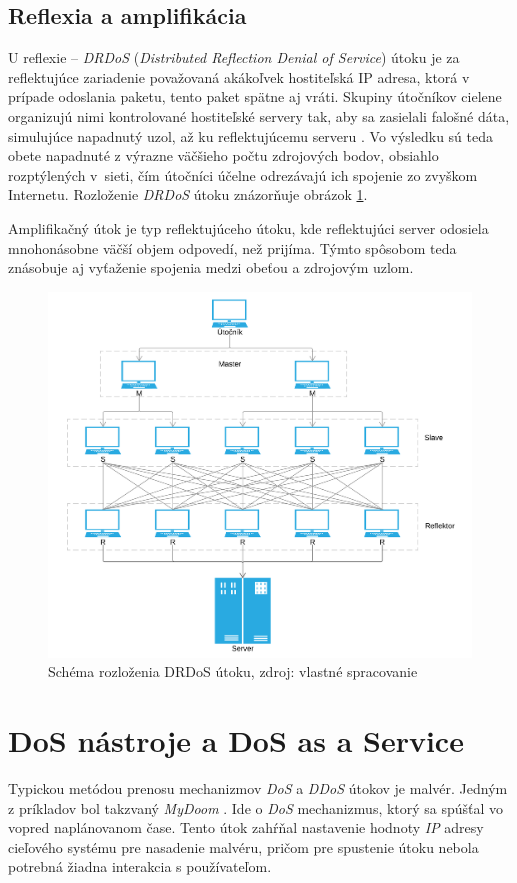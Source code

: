 \documentclass[
  digital, %
  oneside, %
  table,   %
  lof,     %
  nolot,   %
  nocover
]{fithesis3}
\begin{document}
\subsection{Reflexia a amplifikácia}
U reflexie -- \textit{DRDoS} (\textit{Distributed Reflection Denial of Service})
útoku je za reflektujúce zariadenie považovaná akákoľvek hostiteľská IP adresa, 
ktorá v prípade odoslania
paketu, tento paket spätne aj vráti.
Skupiny útočníkov cielene organizujú nimi kontrolované hostiteľské servery tak, aby sa zasielali 
falošné dáta, simulujúce napadnutý uzol, až ku reflektujúcemu serveru \cite{Bukac:2015:DoS}. Vo výsledku sú teda obete 
napadnuté z výrazne väčšieho počtu zdrojových bodov, obsiahlo rozptýlených v~sieti, čím útočníci účelne 
odrezávajú ich spojenie zo zvyškom Internetu. Rozloženie \textit{DRDoS} útoku znázorňuje obrázok \ref{fig:drdos}.

Amplifikačný útok je typ reflektujúceho útoku, kde reflektujúci server odosiela mnohonásobne väčší 
objem odpovedí, než prijíma. Týmto spôsobom teda znásobuje aj vyťaženie spojenia medzi obeťou a 
zdrojovým uzlom\cite{Paxson:2001:DoSR}.

\begin{figure}[h]
  \centering
    \includegraphics[width=\textwidth]{images/drdos.png}
  \caption{Schéma rozloženia DRDoS útoku, zdroj: vlastné spracovanie}
  \label{fig:drdos}
\end{figure}

\section{DoS nástroje a DoS as a Service}
Typickou metódou prenosu mechanizmov \textit{DoS} a \textit{DDoS} útokov je malvér. Jedným z príkladov 
bol
takzvaný \textit{MyDoom} \cite{BBC:2004:DoST}. Ide o \textit{DoS} mechanizmus, ktorý sa spúšťal vo vopred naplánovanom čase.
Tento útok zahŕňal nastavenie hodnoty \textit{IP} adresy cieľového systému pre nasadenie malvéru,
pričom pre spustenie útoku nebola potrebná žiadna interakcia s používateľom.
\end{document}
